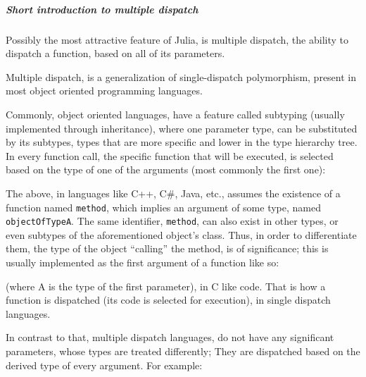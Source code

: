 \documentclass[11pt,a4paper,english,greek,twoside]{thesis}
\begin{document}
\subparagraph{Short introduction to multiple
dispatch}\label{short-introduction-to-multiple-dispatch}

Possibly the most attractive feature of Julia, is multiple dispatch, the
ability to dispatch a function, based on all of its parameters.

Multiple dispatch, is a generalization of single-dispatch polymorphism,
present in most object oriented programming languages.

Commonly, object oriented languages, have a feature called subtyping
(usually implemented through inheritance), where one parameter type, can
be substituted by its subtypes, types that are more specific and lower
in the type hierarchy tree. In every function call, the specific
function that will be executed, is selected based on the type of one of
the arguments (most commonly the first one):

\begin{Shaded}
\begin{Highlighting}[]
\end{Highlighting}
\end{Shaded}

The above, in languages like C++, C\#, Java, etc., assumes the existence
of a function named \texttt{method}, which implies an argument of some
type, named \texttt{objectOfTypeA}. The same identifier,
\texttt{method}, can also exist in other types, or even subtypes of the
aforementioned object's class. Thus, in order to differentiate them, the
type of the object ``calling'' the method, is of significance; this is
usually implemented as the first argument of a function like so:

\begin{Shaded}
\begin{Highlighting}[]
\end{Highlighting}
\end{Shaded}

(where A is the type of the first parameter), in C like code. That is
how a function is dispatched (its code is selected for execution), in
single dispatch languages.

In contrast to that, multiple dispatch languages, do not have any
significant parameters, whose types are treated differently; They are
dispatched based on the derived type of every argument. For example:

\begin{Shaded}
\begin{Highlighting}[]
\end{Highlighting}
\end{Shaded}
\end{document}

